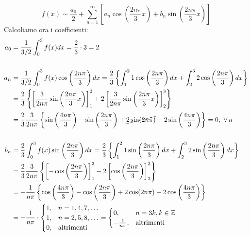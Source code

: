 \begin{figure}[htpb]
\end{figure}
\FloatBarrier

\begin{equation*}
f(x) \sim \frac{a_{0}}{2} + \sum\limits^{\infty}_{n = 1}\left[ a_{n}\cos\left(\frac{2n\pi}{3} x\right) + b_{n}\sin\left(\frac{2n\pi}{3} x\right)\right]
\end{equation*}
Calcoliamo ora i coefficienti:
\begin{align*}
a_{0} & = \frac{1}{3/2}\int^{3}_{0} f(x)dx = \frac{2}{3} \cdot 3 = 2\\
 & \\
a_{n} & = \frac{1}{3/2}\int^{3}_{0} f(x)\cos\left(\frac{2n\pi}{3}\right) dx = \frac{2}{3}\left\{\int^{2}_{1} 1\cos\left(\frac{2n\pi}{3}\right) dx + \int^{3}_{2} 2\cos\left(\frac{2n\pi}{3}\right) dx\right\}\\
 & = \frac{2}{3}\left\{\left[\frac{3}{2n\pi}\sin\left(\frac{2n\pi}{3} x\right)\right]^{2}_{1} + 2\left[\frac{3}{2n\pi}\sin\left(\frac{2n\pi}{3} x\right)\right]^{3}_{2}\right\}\\
 & = \frac{2}{3}\frac{3}{2n\pi}\left\{\sin\left(\frac{4n\pi}{3}\right) - \sin\left(\frac{2n\pi}{3}\right) + \cancel{2\sin(2n\pi)} - 2\sin\left(\frac{4n\pi}{3}\right)\right\} = 0, \ \forall n\\
 & \\
b_{n} & = \frac{2}{3}\int^{3}_{0} f(x)\sin\left(\frac{2n\pi}{3}\right) dx = \frac{2}{3}\left\{\int^{2}_{1} 1\sin\left(\frac{2n\pi}{3}\right) dx + \int^{3}_{2} 2\sin\left(\frac{2n\pi}{3}\right) dx\right\}\\
 & = \frac{2}{3}\frac{3}{2n\pi}\left\{\left[ - \cos\left(\frac{2n\pi}{3}\right)\right]^{2}_{1} - 2\left[\cos\left(\frac{2n\pi}{3}\right)\right]^{3}_{2}\right\}\\
 & = - \frac{1}{n\pi}\left\{\cos\left(\frac{4n\pi}{3}\right) - \cos\left(\frac{2n\pi}{3}\right) + 2\cos(2n\pi) - 2\cos\left(\frac{4n\pi}{3}\right)\right\}\\
 & = - \frac{1}{n\pi} \cdot 
 \begin{cases}
1, & n = 1, 4, 7, \dotsc \\
1, & n = 2, 5, 8, \dotsc \\
0, & \text{altrimenti}
\end{cases} = 
\begin{cases}
0, & n = 3k, k\in \ZZ \\
- \frac{1}{n\pi}, & \text{altrimenti}
\end{cases}
\end{align*}
